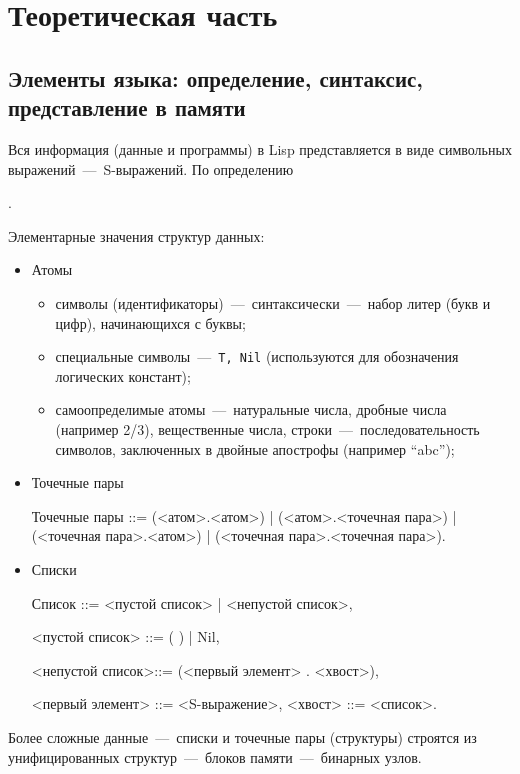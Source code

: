 \setcounter{page}{3}
\chapter{Теоретическая часть}
\section{Элементы языка: определение, синтаксис, представление в памяти}
Вся информация (данные и программы) в Lisp представляется в виде символьных выражений~---~S-выражений. По определению 

\begin{center}
	.
\end{center}

Элементарные значения структур данных: 
\begin{itemize}
	\item Атомы
	\begin{itemize}
		\item символы (идентификаторы)~---~синтаксически~---~набор литер (букв и цифр), начинающихся с буквы;
		\item специальные символы~---~\texttt{{Т, Nil}} (используются для обозначения логических констант);
		\item самоопределимые атомы~---~натуральные числа, дробные числа (например 2/3), вещественные числа, строки~---~последовательность символов, заключенных в двойные апострофы (например “abc”);
	\end{itemize}
	
	\item Точечные пары
	\begin{center}
	Точечные пары ::= (<атом>.<атом>) | (<атом>.<точечная пара>) |
(<точечная пара>.<атом>) | (<точечная пара>.<точечная пара>).
	\end{center}
	
	\item Списки
	\begin{center}
		Список ::= <пустой список> | <непустой список>,
		
		<пустой список> ::= ( ) | Nil,
		
<непустой список>::= (<первый элемент> . <хвост>),

 <первый элемент> ::= <S-выражение>,
<хвост> ::= <список>.
	\end{center}
\end{itemize}

Более сложные данные~---~списки и точечные пары (структуры) строятся из унифицированных структур~---~блоков памяти~---~бинарных узлов.

